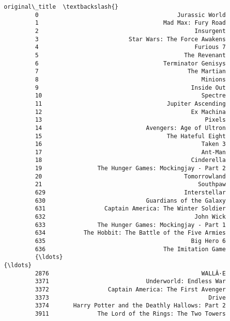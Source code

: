 \documentclass[11pt]{article}
\begin{document}
\begin{Verbatim}[commandchars=\\\{\}]
                                                  original\_title  \textbackslash{}
         0                                        Jurassic World   
         1                                    Mad Max: Fury Road   
         2                                             Insurgent   
         3                          Star Wars: The Force Awakens   
         4                                             Furious 7   
         5                                          The Revenant   
         6                                    Terminator Genisys   
         7                                           The Martian   
         8                                               Minions   
         9                                            Inside Out   
         10                                              Spectre   
         11                                    Jupiter Ascending   
         12                                           Ex Machina   
         13                                               Pixels   
         14                              Avengers: Age of Ultron   
         15                                    The Hateful Eight   
         16                                              Taken 3   
         17                                              Ant-Man   
         18                                           Cinderella   
         19                The Hunger Games: Mockingjay - Part 2   
         20                                         Tomorrowland   
         21                                             Southpaw   
         629                                        Interstellar   
         630                             Guardians of the Galaxy   
         631                 Captain America: The Winter Soldier   
         632                                           John Wick   
         633               The Hunger Games: Mockingjay - Part 1   
         634           The Hobbit: The Battle of the Five Armies   
         635                                          Big Hero 6   
         636                                  The Imitation Game   
         {\ldots}                                                 {\ldots}   
         2876                                            WALLÂ·E   
         3371                            Underworld: Endless War   
         3372                 Captain America: The First Avenger   
         3373                                              Drive   
         3374       Harry Potter and the Deathly Hallows: Part 2   
         3911              The Lord of the Rings: The Two Towers   

\end{Verbatim}
\end{document}
